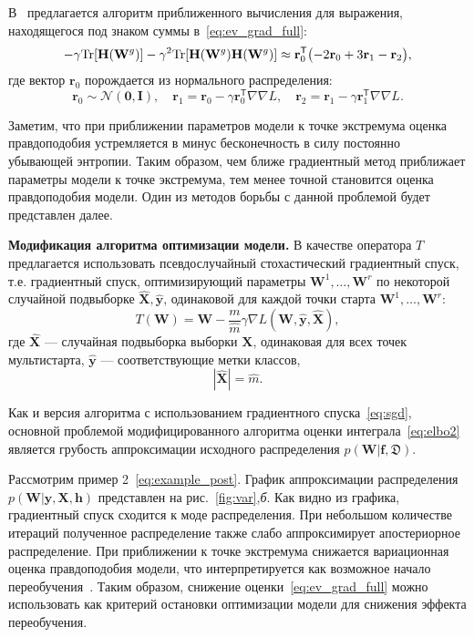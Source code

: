 В~\cite{early} предлагается алгоритм приближенного вычисления для выражения, находящегося под знаком суммы в~\eqref{eq:ev_grad_full}:
\[
	-\gamma \textnormal{Tr}[\mathbf{H}(\mathbf{W}^g)] - \gamma^2 \textnormal{Tr}[\mathbf{H}(\mathbf{W}^g)\mathbf{H}(\mathbf{W}^g)]  \approx \mathbf{r}_0^\mathsf{T}\bigl(-2\mathbf{r}_0 + 3\mathbf{r}_1 -\mathbf{r}_2\bigr),
\]
где вектор $\mathbf{r}_0$  порождается из нормального распределения:
$$\mathbf{r}_0 \sim \mathcal{N}(\mathbf{0}, \mathbf{I}), \quad \mathbf{r}_1 = \mathbf{r}_0 - \gamma \mathbf{r}_0^\mathsf{T} \nabla \nabla L, \quad \mathbf{r}_2 = \mathbf{r}_1 - \gamma \mathbf{r}_1^\mathsf{T} \nabla \nabla L.$$


Заметим, что при приближении параметров модели к точке экстремума оценка правдоподобия устремляется в минус бесконечность в силу постоянно убывающей энтропии. Таким образом, чем ближе градиентный метод приближает параметры модели к точке экстремума, тем менее точной становится оценка правдоподобия модели. Один из методов борьбы с данной проблемой будет представлен далее.


\textbf{Модификация алгоритма оптимизации модели.} 
В качестве оператора $T$ предлагается использовать псевдослучайный стохастический градиентный спуск, т.е. градиентный спуск, оптимизирующий параметры $\mathbf{W}^1,\dots,\mathbf{W}^r$ по некоторой случайной подвыборке $\hat{\mathbf{X}}, \hat{\mathbf{y}}$, одинаковой для каждой точки старта $\mathbf{W}^1,\dots,\mathbf{W}^r$:
\begin{equation}
    \label{eq:sgd}
	T(\mathbf{W}) = \mathbf{W} -  \frac{m}{\hat{m}} \gamma \nabla L(\mathbf{W}, \hat{\mathbf{y}}, \hat{\mathbf{X}}),	
\end{equation}
где $\hat{\mathbf{X}}$ --- случайная подвыборка выборки ${\mathbf{X}}$, одинаковая для всех точек мультистарта, $\hat{\mathbf{y}}$ --- соответствующие метки классов, $$|\hat{\mathbf{X}}| = \hat{m}.$$

Как и версия алгоритма с использованием градиентного спуска~\eqref{eq:sgd}, основной проблемой модифицированного алгоритма оценки интеграла~\eqref{eq:elbo2} является грубость аппроксимации исходного распределения $p(\mathbf{W}|\mathbf{f},\mathfrak{D})$.

Рассмотрим пример 2~\eqref{eq:example_post}.
График аппроксимации распределения $p(\mathbf{W}|\mathbf{y}, \mathbf{X},\mathbf{h})$ представлен на рис.~\ref{fig:var},\textit{б}.
Как видно из графика, градиентный спуск сходится к моде распределения. При небольшом количестве итераций полученное распределение также слабо аппроксимирует апостериорное распределение. {При приближении к точке экстремума снижается вариационная оценка правдоподобия модели, что  интерпретируется как возможное начало переобучения~\cite{early}. Таким образом, снижение оценки~\eqref{eq:ev_grad_full} можно использовать как критерий остановки оптимизации модели для снижения эффекта переобучения.  }

